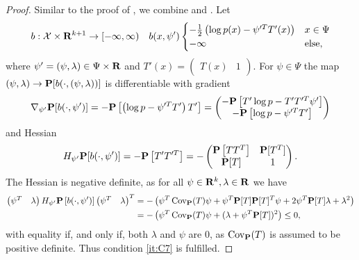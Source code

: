 \begin{proof}
    Similar to the proof of , we combine  and . Let 
    \begin{align*}
        b : \mathcal X \times \R^{k + 1} \to [-\infty, \infty) && b(x, \psi') \begin{cases}
            -\frac{1}{2} \left( \log p(x) - \psi^{\prime T}T'(x) \right) & x \in \Psi \\
            -\infty & \text{else,}
        \end{cases}
    \end{align*}
    where $\psi' = (\psi, \lambda) \in \Psi \times\R$ and $T'(x) = \begin{pmatrix} T(x) & 1 \end{pmatrix}$. For $\psi \in \Psi$ the map $(\psi, \lambda) \to \P [b(\cdot, (\psi, \lambda))]$ is differentiable with gradient 
    $$
        \nabla_{\psi'} \P [b(\cdot, \psi')] = - \P \left[\left( \log p - \psi^{\prime T}T' \right) T'\right] = \begin{pmatrix}
            - \P \left[ T'\log p - T'T^{\prime T}\psi' \right] \\
            -\P \left[ \log p - \psi'^{T}T' \right]
        \end{pmatrix}
    $$
    and Hessian 
    $$
        H_{\psi'} \P[b(\cdot, \psi')] = -\P\left[T'T^{\prime T}\right] = - \begin{pmatrix}
            \P \left[ TT^{T} \right] & \P [T^{T}] \\
            \P [T] & 1
        \end{pmatrix}.
    $$
    The Hessian is negative definite, as for all $\psi\in \R^{k}, \lambda \in \R$ we have
    \begin{align*}
        \begin{pmatrix} \psi^{T} & \lambda \end{pmatrix} H_{\psi'} \P \left[ b(\cdot, \psi') \right]\begin{pmatrix} \psi^{T} & \lambda \end{pmatrix}^{T} &= - \left( \psi^{T} \cov_{\P} (T) \psi + \psi^{T}\P[T]\P[T]^{T}\psi + 2 \psi^{T}\P[T] \lambda + \lambda^{2}\right) \\
                                 &= - \left( \psi^{T}\cov_{\P}(T)\psi + (\lambda + \psi^{T}\P[T])^{2} \right) \leq 0,
    \end{align*}
    with equality if, and only if, both $\lambda$ and $\psi$ are $0$, as $\cov_{\P}(T)$ is assumed to be positive definite. Thus condition \ref{it:C7} is fulfilled.


\end{proof}
